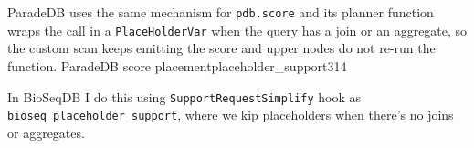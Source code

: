 ParadeDB uses the same mechanism for \texttt{pdb.score} and its planner function wraps the call in a \texttt{PlaceHolderVar} when the query has a join or an aggregate, so the custom scan keeps emitting the score and upper nodes do not re-run the function.
  {ParadeDB score placement}{placeholder_support}{314}

In BioSeqDB I do this using \texttt{SupportRequestSimplify} hook as \texttt{bioseq\_placeholder\_support}, where we kip placeholders when there's no joins or aggregates.